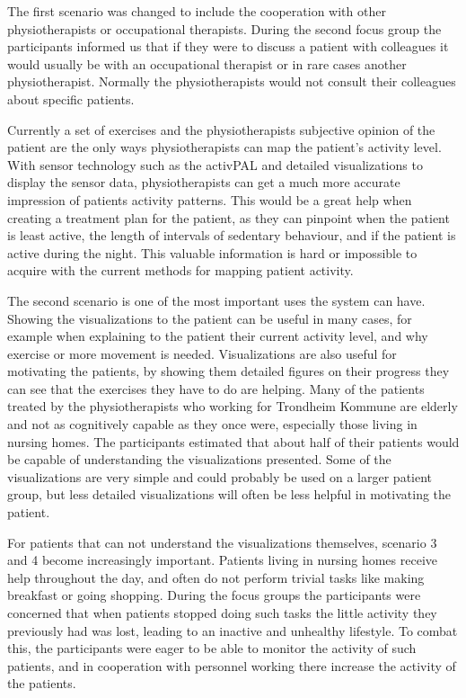 The first scenario was changed to include the cooperation with other physiotherapists or occupational therapists. During the second focus group the participants informed us that if they were to discuss a patient with colleagues it would usually be with an occupational therapist or in rare cases another physiotherapist. Normally the physiotherapists would not consult their colleagues about specific patients. 

Currently a set of exercises and the physiotherapists subjective opinion of the patient are the only ways physiotherapists can map the patient's activity level. With sensor technology such as the activPAL and detailed visualizations to display the sensor data, physiotherapists can get a much more accurate impression of patients activity patterns. This would be a great help when creating a treatment plan for the patient, as they can pinpoint when the patient is least active, the length of intervals of sedentary behaviour, and if the patient is active during the night. This valuable information is hard or impossible to acquire with the current methods for mapping patient activity.

The second scenario is one of the most important uses the system can have. Showing the visualizations to the patient can be useful in many cases, for example when explaining to the patient their current activity level, and why exercise or more movement is needed. Visualizations are also useful for motivating the patients, by showing them detailed figures on their progress they can see that the exercises they have to do are helping. Many of the patients treated by the physiotherapists who working for Trondheim Kommune are elderly and not as cognitively capable as they once were, especially those living in nursing homes. The participants estimated that about half of their patients would be capable of understanding the visualizations presented. Some of the visualizations are very simple and could probably be used on a larger patient group, but less detailed visualizations will often be less helpful in motivating the patient. 

For patients that can not understand the visualizations themselves, scenario 3 and 4 become increasingly important. Patients living in nursing homes receive help throughout the day, and often do not perform trivial tasks like making breakfast or going shopping. During the focus groups the participants were concerned that when patients stopped doing such tasks the little activity they previously had was lost, leading to an inactive and unhealthy lifestyle. To combat this, the participants were eager to be able to monitor the activity of such patients, and in cooperation with personnel working there increase the activity of the patients. 

